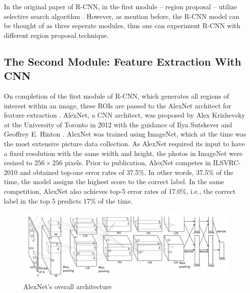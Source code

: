 In the original paper of R-CNN, in the first module -- region proposal -- utilize selective search algorithm \cite{Girshick_R_CNN_2013}. However, as mention before, the R-CNN model can be thought of as three seperate modules, thus one can experiment R-CNN with different region proposal technique.

\subsection{The Second Module: Feature Extraction With CNN}
On completion of the first module of R-CNN, which generates all regions of interest within an image, these ROIs are passed to the AlexNet architect for feature extraction \cite{Girshick_R_CNN_2013}. AlexNet, a CNN architect, was proposed by Alex Krizhevsky at the University of Toronto in 2012 with the guidance of Ilya Sutskever and Geoffrey E. Hinton \cite{AlexNet_2017}. AlexNet was trained using ImageNet, which at the time was the most extensive picture data collection. As AlexNet required its input to have a fixed resolution with the same width and height, the photos in ImageNet were resized to $256 \times 256$ pixels. Prior to publication, AlexNet competes in ILSVRC-2010 and obtained top-one error rates of 37.5\%. In other words, 37.5\% of the time, the model assigns the highest score to the correct label.  In the same competition, AlexNet also achieves top-5 error rates of 17.0\%, i.e., the correct label in the top 5 predicts 17\% of the time.

\begin{figure}[!ht]
    \centering
    \includegraphics[width=6in]{figures/alex_net.png}
    \caption{AlexNet's overall architecture \cite{AlexNet_2017}} \label{fig:alex_net_architecture}
\end{figure}

